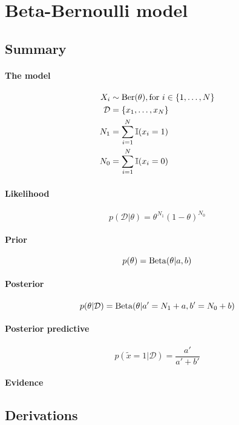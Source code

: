 \section{Beta-Bernoulli model}
\subsection{Summary}
\paragraph{The model}
    \begin{align}
        X_i         &\sim \operatorname{Ber}(\theta), \text{for } i \in \{1, \dotsc, N\} \\
        \mathcal D  &= \{x_1, \dotsc, x_N\} \\
        N_1         &= \sum_{i = 1}^N \mathbb I (x_i = 1) \\
        N_0         &= \sum_{i = 1}^N \mathbb I (x_i = 0)
    \end{align}

\paragraph{Likelihood}
    \begin{equation}
        p(\mathcal D | \theta) = \theta^{N_1} (1 - \theta)^{N_0}
    \end{equation}

\paragraph{Prior}
    \begin{equation}
        p(\theta)   = \operatorname{Beta}(\theta | a, b)
    \end{equation}

\paragraph{Posterior}
    \begin{equation}
        p(\theta | \mathcal D) = \operatorname{Beta}(\theta | a' = N_1 + a, b' = N_0 + b)
    \end{equation}

\paragraph{Posterior predictive}
    \begin{equation}
        p(\tilde x = 1 | \mathcal D) = \frac{a'}{a' + b'}
    \end{equation}

\paragraph{Evidence}

\subsection{Derivations}
